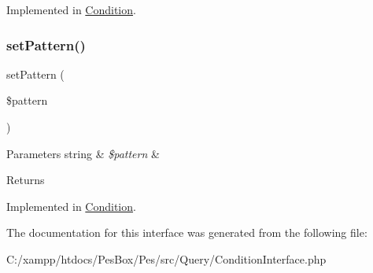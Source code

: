 Implemented in \mbox{\hyperlink{class_pes_1_1_query_1_1_condition_af7996c125b44ce3a42130ccc56edf9f4}{Condition}}.

\mbox{\label{interface_pes_1_1_query_1_1_condition_interface_a36b6c101a93edd2abc86e7fc4507b5fa}} 
\subsubsection{\texorpdfstring{set\+Pattern()}{setPattern()}}
{\footnotesize\ttfamily set\+Pattern (\begin{DoxyParamCaption}\item[{}]{\$pattern }\end{DoxyParamCaption})}


\begin{DoxyParams}[1]{Parameters}
string & {\em \$pattern} & \\
\hline
\end{DoxyParams}
\begin{DoxyReturn}{Returns}

\end{DoxyReturn}


Implemented in \mbox{\hyperlink{class_pes_1_1_query_1_1_condition_a36b6c101a93edd2abc86e7fc4507b5fa}{Condition}}.



The documentation for this interface was generated from the following file\+:\begin{DoxyCompactItemize}
\item 
C\+:/xampp/htdocs/\+Pes\+Box/\+Pes/src/\+Query/Condition\+Interface.\+php\end{DoxyCompactItemize}
